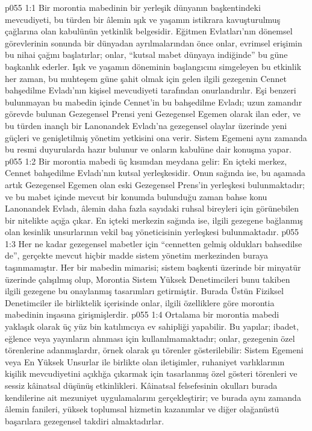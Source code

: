 \vs p055 1:1 Bir morontia mabedinin bir yerleşik dünyanın başkentindeki mevcudiyeti, bu türden bir âlemin ışık ve yaşamın istikrara kavuşturulmuş çağlarına olan kabulünün yetkinlik belgesidir. Eğitmen Evlatları’nın dönemsel görevlerinin sonunda bir dünyadan ayrılmalarından önce onlar, evrimsel erişimin bu nihai çağını başlatırlar; onlar, “kutsal mabet dünyaya indiğinde” bu güne başkanlık ederler. Işık ve yaşamın döneminin başlangıcını simgeleyen bu etkinlik her zaman, bu muhteşem güne şahit olmak için gelen ilgili gezegenin Cennet bahşedilme Evladı’nın kişisel mevcudiyeti tarafından onurlandırılır. Eşi benzeri bulunmayan bu mabedin içinde Cennet’in bu bahşedilme Evladı; uzun zamandır görevde bulunan Gezegensel Prensi yeni Gezegensel Egemen olarak ilan eder, ve bu türden inançlı bir Lanonandek Evladı’na gezegensel olaylar üzerinde yeni güçleri ve genişletilmiş yönetim yetkisini ona verir. Sistem Egemeni aynı zamanda bu resmi duyurularda hazır bulunur ve onların kabulüne dair konuşma yapar.
\vs p055 1:2 Bir morontia mabedi üç kısımdan meydana gelir: En içteki merkez, Cennet bahşedilme Evladı’nın kutsal yerleşkesidir. Onun sağında ise, bu aşamada artık Gezegensel Egemen olan eski Gezegensel Prens’in yerleşkesi bulunmaktadır; ve bu mabet içinde mevcut bir konumda bulunduğu zaman bahse konu Lanonandek Evladı, âlemin daha fazla sayıdaki ruhsal bireyleri için görünebilen bir nitelikte açığa çıkar. En içteki merkezin sağında ise, ilgili gezegene bağlanmış olan kesinlik unsurlarının vekil baş yöneticisinin yerleşkesi bulunmaktadır.
\vs p055 1:3 Her ne kadar gezegensel mabetler için “cennetten gelmiş oldukları bahsedilse de”, gerçekte mevcut hiçbir madde sistem yönetim merkezinden buraya taşınmamıştır. Her bir mabedin mimarisi; sistem başkenti üzerinde bir minyatür üzerinde çalışılmış olup, Morontia Sistem Yüksek Denetimcileri bunu takiben ilgili gezegene bu onaylanmış tasarımları getirmiştir. Burada Üstün Fiziksel Denetimciler ile birliktelik içerisinde onlar, ilgili özelliklere göre morontia mabedinin inşasına girişmişlerdir.
\vs p055 1:4 Ortalama bir morontia mabedi yaklaşık olarak üç yüz bin katılımcıya ev sahipliği yapabilir. Bu yapılar; ibadet, eğlence veya yayınların alınması için kullanılmamaktadır; onlar, gezegenin özel törenlerine adanmışlardır, örnek olarak şu törenler gösterilebilir: Sistem Egemeni veya En Yüksek Unsurlar ile birlikte olan iletişimler, ruhaniyet varlıklarının kişilik mevcudiyetini açıklığa çıkarmak için tasarlanmış özel gösteri törenleri ve sessiz kâinatsal düşünüş etkinlikleri. Kâinatsal felsefesinin okulları burada kendilerine ait mezuniyet uygulamalarını gerçekleştirir; ve burada aynı zamanda âlemin fanileri, yüksek toplumsal hizmetin kazanımlar ve diğer olağanüstü başarılara gezegensel takdiri almaktadırlar.
